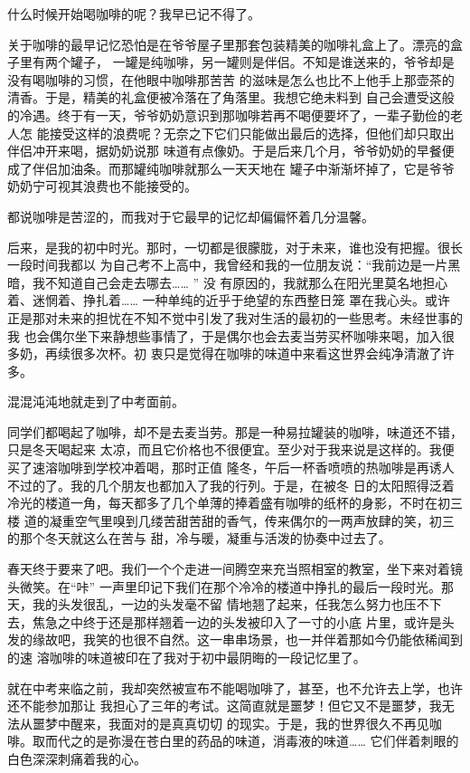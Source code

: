 

		什么时候开始喝咖啡的呢？我早已记不得了。

		关于咖啡的最早记忆恐怕是在爷爷屋子里那套包装精美的咖啡礼盒上了。漂亮的盒子里有两个罐子，
	一罐是纯咖啡，另一罐则是伴侣。不知是谁送来的，爷爷却是没有喝咖啡的习惯，在他眼中咖啡那苦苦
	的滋味是怎么也比不上他手上那壶茶的清香。于是，精美的礼盒便被冷落在了角落里。我想它绝未料到
	自己会遭受这般的冷遇。终于有一天，爷爷奶奶意识到那咖啡若再不喝便要坏了，一辈子勤俭的老人怎
	能接受这样的浪费呢？无奈之下它们只能做出最后的选择，但他们却只取出伴侣冲开来喝，据奶奶说那
	味道有点像奶。于是后来几个月，爷爷奶奶的早餐便成了伴侣加油条。而那罐纯咖啡就那么一天天地在
	罐子中渐渐坏掉了，它是爷爷奶奶宁可视其浪费也不能接受的。

		都说咖啡是苦涩的，而我对于它最早的记忆却偏偏怀着几分温馨。

		后来，是我的初中时光。那时，一切都是很朦胧，对于未来，谁也没有把握。很长一段时间我都以
	为自己考不上高中，我曾经和我的一位朋友说：“我前边是一片黑暗，我不知道自己会走去哪去…… ” 没
	有原因的，我就那么在阳光里莫名地担心着、迷惘着、挣扎着…… 一种单纯的近乎于绝望的东西整日笼
	罩在我心头。或许正是那对未来的担忧在不知不觉中引发了我对生活的最初的一些思考。未经世事的我
	也会偶尔坐下来静想些事情了，于是偶尔也会去麦当劳买杯咖啡来喝，加入很多奶，再续很多次杯。初
	衷只是觉得在咖啡的味道中来看这世界会纯净清澈了许多。

		混混沌沌地就走到了中考面前。

		同学们都喝起了咖啡，却不是去麦当劳。那是一种易拉罐装的咖啡，味道还不错，只是冬天喝起来
	太凉，而且它价格也不很便宜。至少对于我来说是这样的。我便买了速溶咖啡到学校冲着喝，那时正值
	隆冬，午后一杯香喷喷的热咖啡是再诱人不过的了。我的几个朋友也都加入了我的行列。于是，在被冬
	日的太阳照得泛着冷光的楼道一角，每天都多了几个单薄的捧着盛有咖啡的纸杯的身影，不时在初三楼
	道的凝重空气里嗅到几缕苦甜苦甜的香气，传来偶尔的一两声放肆的笑，初三的那个冬天就这么在苦与
	甜，冷与暖，凝重与活泼的协奏中过去了。

		春天终于要来了吧。我们一个个走进一间腾空来充当照相室的教室，坐下来对着镜头微笑。在“咔”
	一声里印记下我们在那个冷冷的楼道中挣扎的最后一段时光。那天，我的头发很乱，一边的头发毫不留
	情地翘了起来，任我怎么努力也压不下去，焦急之中终于还是那样翘着一边的头发被印入了一寸的小底
	片里，或许是头发的缘故吧，我笑的也很不自然。这一串串场景，也一并伴着那如今仍能依稀闻到的速
	溶咖啡的味道被印在了我对于初中最阴晦的一段记忆里了。

		就在中考来临之前，我却突然被宣布不能喝咖啡了，甚至，也不允许去上学，也许还不能参加那让
	我担心了三年的考试。这简直就是噩梦！但它又不是噩梦，我无法从噩梦中醒来，我面对的是真真切切
	的现实。于是，我的世界很久不再见咖啡。取而代之的是弥漫在苍白里的药品的味道，消毒液的味道……
	它们伴着刺眼的白色深深刺痛着我的心。

